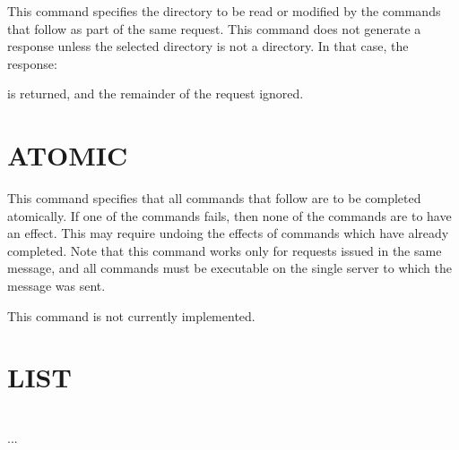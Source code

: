 \begin{command}
  \commandsize {}  
	\zoos{}\zooe \selectlines
\end{command}


This command specifies the directory to be read or modified by the
commands that follow as part of the same request.  This command
does not generate a response unless the selected directory is not a
directory.  In that case, the response:
\begin{command}
\end{command}
is returned, and the remainder of the request ignored.

\section{ATOMIC}

\begin{command}
  \commandsize {}
\end{command}

This command specifies that all commands that follow are to be
completed atomically.  If one of the commands fails, then none of the
commands are to have an effect.  This may require undoing the effects
of commands which have already completed.  Note that this command works
only for requests issued in the same message, and all commands must
be executable on the single server to which the message was sent.

This command is not currently implemented.

\section{LIST}

\begin{command}
  \commandsize {}  
	\zoms{}\zome\selectlines{}\\
	 ... 
\end{command}

